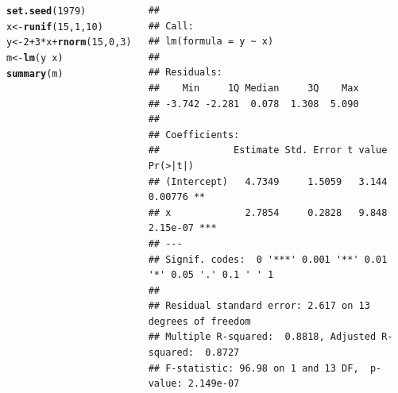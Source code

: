 \documentclass{beamer}\usepackage[]{graphicx}\usepackage[]{color}
\makeatletter
\newcommand{\hlnum}[1]{\textcolor[rgb]{0.686,0.059,0.569}{#1}}%
\newcommand{\hlopt}[1]{\textcolor[rgb]{0,0,0}{#1}}%
\newcommand{\hlstd}[1]{\textcolor[rgb]{0.345,0.345,0.345}{#1}}%
\newcommand{\hlkwb}[1]{\textcolor[rgb]{0.69,0.353,0.396}{#1}}%
\newcommand{\hlkwd}[1]{\textcolor[rgb]{0.737,0.353,0.396}{\textbf{#1}}}%
\newenvironment{kframe}{%
 \def\at@end@of@kframe{}%
 \ifinner\ifhmode%
  \def\at@end@of@kframe{\end{minipage}}%
  \begin{minipage}{\columnwidth}%
 \fi\fi%
 \def\FrameCommand##1{\hskip\@totalleftmargin \hskip-\fboxsep
 \colorbox{shadecolor}{##1}\hskip-\fboxsep
     \hskip-\linewidth \hskip-\@totalleftmargin \hskip\columnwidth}%
 \MakeFramed {\advance\hsize-\width
   \@totalleftmargin\z@ \linewidth\hsize
   \@setminipage}}%
 {\par\unskip\endMakeFramed%
 \at@end@of@kframe}
\newenvironment{knitrout}{}{} %
\renewenvironment{knitrout}{\setlength{\topsep}{0mm}}{}
\makeatother
\begin{document}
\begin{frame}[fragile]

\begin{columns}[t]


\begin{knitrout}\tiny
{}\color{fgcolor}\begin{kframe}
\begin{alltt}
\hlkwd{set.seed}\hlstd{(}\hlnum{1979}\hlstd{)}
\hlstd{x} \hlkwb{<-} \hlkwd{runif}\hlstd{(}\hlnum{15}\hlstd{,}\hlnum{1}\hlstd{,}\hlnum{10}\hlstd{)}
\hlstd{y} \hlkwb{<-} \hlnum{2} \hlopt{+} \hlnum{3}\hlopt{*}\hlstd{x} \hlopt{+} \hlkwd{rnorm}\hlstd{(}\hlnum{15}\hlstd{,}\hlnum{0}\hlstd{,}\hlnum{3}\hlstd{)}
\hlstd{m} \hlkwb{<-} \hlkwd{lm}\hlstd{(y} \hlopt{~} \hlstd{x)}
\hlkwd{summary}\hlstd{(m)}
\end{alltt}
\begin{verbatim}
## 
## Call:
## lm(formula = y ~ x)
## 
## Residuals:
##    Min     1Q Median     3Q    Max 
## -3.742 -2.281  0.078  1.308  5.090 
## 
## Coefficients:
##             Estimate Std. Error t value Pr(>|t|)    
## (Intercept)   4.7349     1.5059   3.144  0.00776 ** 
## x             2.7854     0.2828   9.848 2.15e-07 ***
## ---
## Signif. codes:  0 '***' 0.001 '**' 0.01 '*' 0.05 '.' 0.1 ' ' 1
## 
## Residual standard error: 2.617 on 13 degrees of freedom
## Multiple R-squared:  0.8818,	Adjusted R-squared:  0.8727 
## F-statistic: 96.98 on 1 and 13 DF,  p-value: 2.149e-07
\end{verbatim}
\end{kframe}
\end{knitrout}



\end{columns}
\end{frame}
\end{document}
